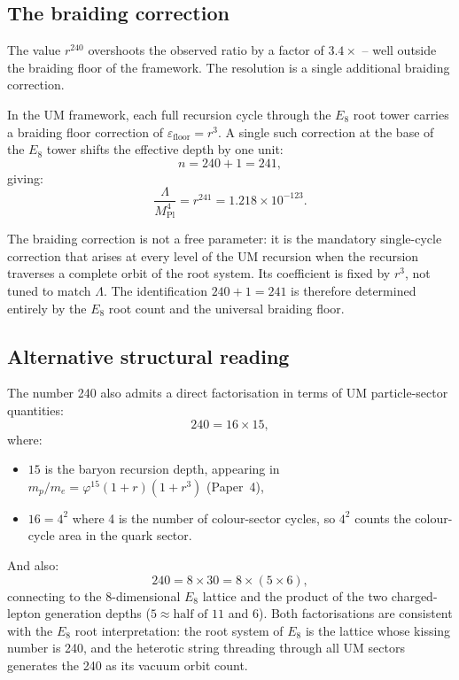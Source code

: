 \documentclass[12pt]{article}
\begin{document}
\subsection{The braiding correction}

The value $r^{240}$ overshoots the observed ratio by a factor of
$3.4\times$ -- well outside the braiding floor of the framework.
The resolution is a single additional braiding correction.

In the UM framework, each full recursion cycle through the $E_8$
root tower carries a braiding floor correction of
$\varepsilon_{\text{floor}} = r^3$.  A single such correction at
the base of the $E_8$ tower shifts the effective depth by one unit:
\begin{equation}
  n = 240 + 1 = 241,
  \label{eq:n241}
\end{equation}
giving:
\begin{equation}
  \frac{\Lambda}{M_{\text{Pl}}^4}
    = r^{241}
    = 1.218 \times 10^{-123}.
  \label{eq:result}
\end{equation}

The braiding correction is not a free parameter: it is the
mandatory single-cycle correction that arises at every level of
the UM recursion when the recursion traverses a complete orbit
of the root system.  Its coefficient is fixed by $r^3$, not
tuned to match $\Lambda$.  The identification $240 + 1 = 241$
is therefore determined entirely by the $E_8$ root count and
the universal braiding floor.

\subsection{Alternative structural reading}

The number 240 also admits a direct factorisation in terms of
UM particle-sector quantities:
\begin{equation}
  240 = 16 \times 15,
  \label{eq:factorA}
\end{equation}
where:
\begin{itemize}
  \item $15$ is the baryon recursion depth, appearing in
        $m_p/m_e = \varphi^{15}(1+r)(1+r^3)$ (Paper~4),
  \item $16 = 4^2$ where 4 is the number of colour-sector cycles,
        so $4^2$ counts the colour-cycle area in the quark sector.
\end{itemize}

And also:
\begin{equation}
  240 = 8 \times 30 = 8 \times (5 \times 6),
  \label{eq:factorB}
\end{equation}
connecting to the 8-dimensional $E_8$ lattice and the product of
the two charged-lepton generation depths ($5 \approx \text{half of }11$
and 6).  Both factorisations are consistent with the $E_8$ root
interpretation: the root system of $E_8$ is the lattice whose
kissing number is 240, and the heterotic string threading through
all UM sectors generates the 240 as its vacuum orbit count.
\end{document}
